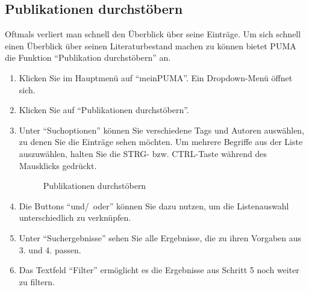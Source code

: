 \subsection{Publikationen durchstöbern}
Oftmals verliert man schnell den Überblick über seine Einträge. Um sich schnell einen Überblick über seinen Literaturbestand machen zu können bietet PUMA die Funktion \enquote{Publikation durchstöbern} an. 
\begin{enumerate}
    \item Klicken Sie im Hauptmenü auf \enquote{meinPUMA}. Ein Dropdown-Menü öffnet sich.
    \item Klicken Sie auf \enquote{Publikationen durchstöbern}.
    \item Unter \enquote{Suchoptionen} können Sie verschiedene Tags und Autoren auswählen, zu denen Sie die Einträge sehen möchten. Um mehrere Begriffe aus der Liste auszuwählen, halten Sie die STRG- bzw. CTRL-Taste während des Mausklicks gedrückt.
\begin{figure}[h!]
 \centering
 \caption{Publikationen durchstöbern}
 \label{figure029}
\end{figure}
    \item Die Buttons \enquote{und/~oder} können Sie dazu nutzen, um die Listenauswahl unterschiedlich zu verknüpfen. 
    \item Unter \enquote{Suchergebnisse} sehen Sie alle Ergebnisse, die zu ihren Vorgaben aus 3. und 4. passen.
    \item Das Textfeld \enquote{Filter} ermöglicht es die Ergebnisse aus Schritt 5 noch weiter zu filtern.
\end{enumerate}
